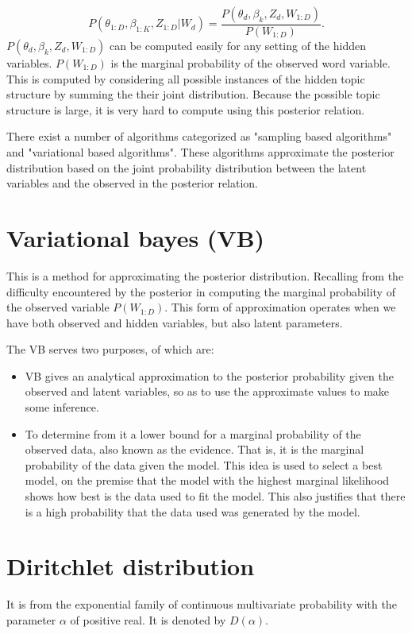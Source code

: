 $$P(\theta_{1:D},\beta_{1:K},Z_{1:D}|W_d)=\frac{P(\theta_d,\beta_k,Z_d,W_{1:D})}{P(W_{1:D})}\text{.}$$
$P(\theta_d,\beta_k,Z_d,W_{1:D})$ can be computed easily for any setting of the hidden variables. $P(W_{1:D})$ is the marginal probability of the observed word variable. This is computed by considering all possible instances of the hidden topic structure by summing the their joint distribution. Because the possible topic structure is large, it is very hard to compute using this posterior relation.

There exist a number of algorithms categorized as "sampling based algorithms" and "variational based algorithms". These algorithms approximate the posterior distribution based on the joint probability distribution between the latent variables and the observed in the posterior relation.

\section{Variational bayes (VB)}
This is a method for approximating the posterior distribution. Recalling from the difficulty encountered by the posterior in computing the marginal probability of the observed variable $P(W_{1:D})$. This form of approximation operates when we have both observed and hidden variables, but also latent parameters.

The VB serves two purposes, of which are:
\begin{itemize}
\item VB gives an analytical approximation to the posterior probability given the observed and latent variables, so as to use the approximate values to make some inference.
\item To determine from it a lower bound for a marginal probability of the observed data, also known as the evidence. That is, it is the marginal probability of the data given the model. 
This idea is used to select a best model, on the premise that the model with the highest marginal likelihood shows how best is the data used to fit the model. This also justifies that there is a high probability that the data used was generated by the model.
\end{itemize}
\section{Diritchlet distribution}
It is from the exponential family of continuous multivariate probability with the parameter $\alpha$ of positive real. It is denoted by $D(\alpha)$.

